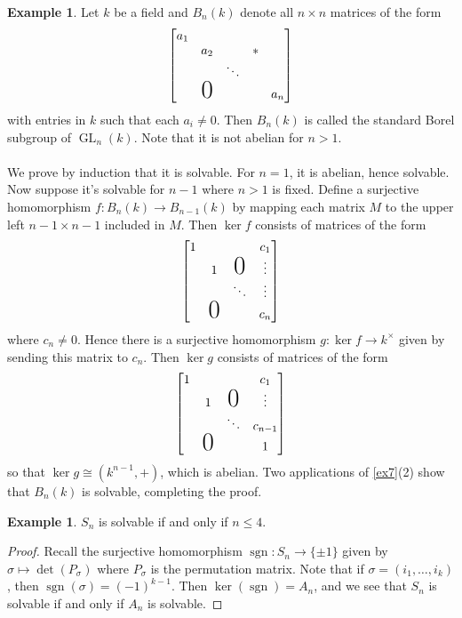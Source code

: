\documentclass[10pt,letterpaper,cm]{nupset}
\theoremstyle{definition}
\newtheorem{exmp}[definition]{Example}
\theoremstyle{theorem}
\theoremstyle{remark}
\newcommand{\1}{\mathbf{1}}
\newcommand{\0}{\vec 0}
\DeclareMathOperator*{\GL}{GL}
\DeclareMathOperator{\sgn}{sgn}
\begin{document}
\begin{exmp}
Let $k$ be a field and  $B_n(k)$ denote all $n\times n$ matrices of the form
\[
  \left[
    \begin{matrix}
       a_1 & & &  &\\
       & a_2 & & \ast  \\
       & & \ddots & & \\
       & \text{\huge0}  & & & a_{n} 
\\
    \end{matrix}
  \right]
\] with entries in $k$ such that each $a_i \ne 0$. Then $B_n(k)$ is called the standard Borel subgroup of $\GL_n(k)$. Note that it is not abelian for $n>1$. 
\\ \\ We prove by induction that it is solvable.  For $n=1$, it is abelian, hence solvable. Now suppose it's solvable for $n-1$ where $n>1$ is fixed. Define a surjective homomorphism $f: B_n(k) \to B_{n-1}(k)$ by mapping each matrix $M$ to the upper left $n-1 \times n-1$ included in $M$. Then $\ker f$ consists of matrices of the form
\[
  \left[
    \begin{matrix}
       1 & & &  c_1\\
       & 1 &  \text{\huge0} & \vdots \\
       & & \ddots & \vdots  \\
        & \text{\huge0}  & &  c_{n} 
\\
    \end{matrix}
  \right]
\] where $c_{n} \ne 0$. Hence there is a surjective homomorphism $g: \ker f \to k^{\times}$ given by sending this matrix to $c_n$. Then $\ker g$ consists of matrices of the form
\[
  \left[
    \begin{matrix}
       1 & & &  c_1\\
       & 1 &  \text{\huge0} & \vdots \\
       & & \ddots & c_{n-1}  \\
        & \text{\huge0}  & &  1 
\\
    \end{matrix}
  \right]
  \] so that $\ker g \cong (k^{n-1}, +)$, which is abelian.  Two applications of \cref{ex7}(2) show that $B_n(k)$ is solvable, completing the proof.
\end{exmp}

\begin{exmp}
$S_n$ is solvable  if and only if $n\leq 4$.
\end{exmp}

\begin{proof}
Recall the surjective homomorphism $\sgn: S_n \to \{\pm 1\}$ given by $\sigma \mapsto \det(P_\sigma)$ where $P_\sigma$ is the permutation matrix. Note that if $\sigma = (i_1, \ldots, i_k)$, then $\sgn(\sigma) = (-1)^{k-1}$. Then $\ker(\sgn) = A_n$, and we see that $S_n$ is solvable  if and only if $A_n$ is solvable. 
\end{proof}
\end{document}

